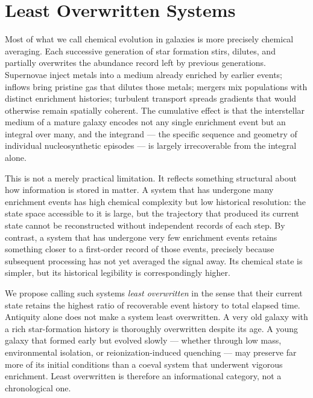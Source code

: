 \documentclass[12pt, a4paper]{article}
\theoremstyle{definition}
\begin{document}
\newpage

\section{Least Overwritten Systems}
\label{sec:overwrite}

Most of what we call chemical evolution in galaxies is more precisely chemical
averaging. Each successive generation of star formation stirs, dilutes, and
partially overwrites the abundance record left by previous generations.
Supernovae inject metals into a medium already enriched by earlier events;
inflows bring pristine gas that dilutes those metals; mergers mix populations
with distinct enrichment histories; turbulent transport spreads gradients that
would otherwise remain spatially coherent. The cumulative effect is that the
interstellar medium of a mature galaxy encodes not any single enrichment event
but an integral over many, and the integrand --- the specific sequence and
geometry of individual nucleosynthetic episodes --- is largely irrecoverable
from the integral alone.

This is not a merely practical limitation. It reflects something structural
about how information is stored in matter. A system that has undergone many
enrichment events has high chemical complexity but low historical resolution:
the state space accessible to it is large, but the trajectory that produced
its current state cannot be reconstructed without independent records of each
step. By contrast, a system that has undergone very few enrichment events
retains something closer to a first-order record of those events, precisely
because subsequent processing has not yet averaged the signal away. Its
chemical state is simpler, but its historical legibility is correspondingly
higher.

We propose calling such systems \emph{least overwritten} in the sense that
their current state retains the highest ratio of recoverable event history to
total elapsed time. Antiquity alone does not make a system least overwritten.
A very old galaxy with a rich star-formation history is thoroughly overwritten
despite its age. A young galaxy that formed early but evolved slowly ---
whether through low mass, environmental isolation, or reionization-induced
quenching --- may preserve far more of its initial conditions than a coeval
system that underwent vigorous enrichment. Least overwritten is therefore an
informational category, not a chronological one.
\end{document}
